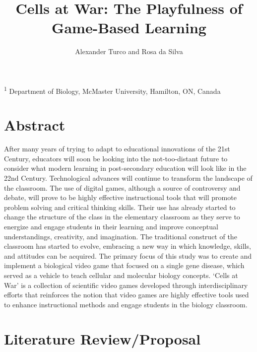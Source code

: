 \documentclass{article}
\title{\sc Cells at War: The Playfulness of Game-Based Learning}
\author{\sc Alexander Turco and Rosa da Silva}
\begin{document}

\onecolumn
                        \maketitle

\thispagestyle{empty}
\noindent \textsuperscript{1} Department of Biology, McMaster University, Hamilton, ON, Canada

\newpage
\tableofcontents
\newpage

\section{Abstract}

After many years of trying to adapt to educational innovations of the 21st Century, educators will soon be looking into the not-too-distant future to consider what modern learning in post-secondary education will look like in the 22nd Century. Technological advances will continue to transform the landscape of the classroom. The use of digital games, although a source of controversy and debate, will prove to be highly effective instructional tools that will promote problem solving and critical thinking skills. Their use has already started to change the structure of the class in the elementary classroom as they serve to energize and engage students in their learning and improve conceptual understandings, creativity, and imagination. The traditional construct of the classroom has started to evolve, embracing a new way in which knowledge, skills, and attitudes can be acquired. The primary focus of this study was to create and implement a biological video game that focused on a single gene disease, which served as a vehicle to teach cellular and molecular biology concepts. ‘Cells at War’ is a collection of scientific video games developed through interdisciplinary efforts that reinforces the notion that video games are highly effective tools used to enhance instructional methods and engage students in the biology classroom.

\newpage
       
\section{Literature Review/Proposal}
\end{document}
